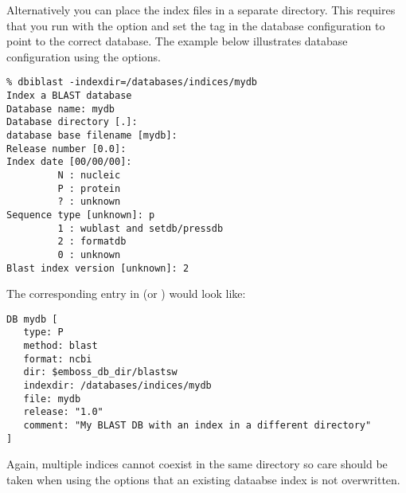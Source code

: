\documentclass{report}
\begin{document}
Alternatively you can place the index files in a separate directory. This requires that you run  with the  option and set the  tag in the database configuration to point to the correct database. The example below illustrates database configuration using the  options.

\begin{verbatim}
% dbiblast -indexdir=/databases/indices/mydb
Index a BLAST database
Database name: mydb
Database directory [.]: 
database base filename [mydb]: 
Release number [0.0]: 
Index date [00/00/00]: 
         N : nucleic
         P : protein
         ? : unknown
Sequence type [unknown]: p
         1 : wublast and setdb/pressdb
         2 : formatdb
         0 : unknown
Blast index version [unknown]: 2

\end{verbatim}

The corresponding entry in  (or ) would look like:


\begin{verbatim}
DB mydb [
   type: P
   method: blast
   format: ncbi
   dir: $emboss_db_dir/blastsw
   indexdir: /databases/indices/mydb
   file: mydb
   release: "1.0"
   comment: "My BLAST DB with an index in a different directory"
]
\end{verbatim}

Again, multiple indices cannot coexist in the same directory so care should be taken when using the  options that an existing dataabse index is not overwritten.

\begin{comment}
\subsubsection{FASTA formats used with \progname{dbiblast}}
\label{subsec:fasta}
The following FASTA formats are recognised by \progname{dbiblast}:

\begin{tabular}[t]{|l|l|}\hline \setlength{\baselineskip}{1.2\baselineskip}
GENBANK/NCBI & \ilcomm{> \ldots |accno|id \ldots }\\
\hline
GCG & \ilcomm{>{\sl dbname}:accno id \ldots }\\
\hline
SIMPLE &\ilcomm{ >accno id \ldots} \\
\hline
ID & \ilcomm{>id}\\
\hline
\end{tabular}
\ilcomm{...} refers to any text. Note that the ID must be the only item in the header for the ID format.\footnote{Recent changes to \progname{dbifasta} may propogate through to \progname{dbiblast} allowing for the indexing of a wider variety of formats than at present (version 1.1.0)}
\end{comment}
\end{document}
